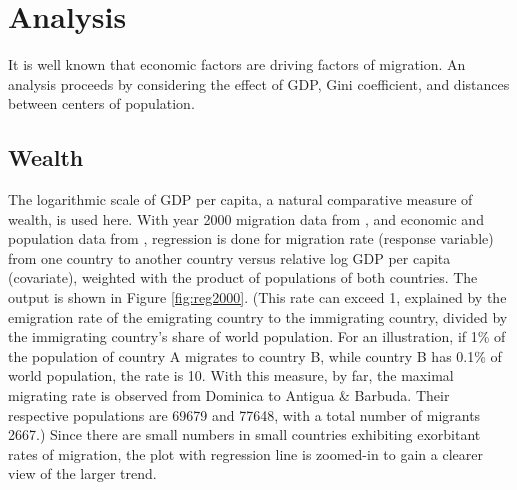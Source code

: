 \documentclass{acm_proc_article-sp}
\begin{document}
\section{Analysis}
It is well known that economic factors are driving factors of migration. An analysis proceeds by considering the effect of GDP, Gini coefficient, and distances between centers of population.

\subsection{Wealth}
The logarithmic scale of GDP per capita, a natural comparative measure of wealth, is used here. With year 2000 migration data from \cite{drc}, and economic and population data from \cite{worldbank_other}, regression \cite{scikit-learn} is done for migration rate (response variable) from one country to another country versus relative log GDP per capita (covariate), weighted with the product of populations of both countries. The output is shown in Figure \ref{fig:reg2000}. (This rate can exceed 1, explained by the emigration rate of the emigrating country to the immigrating country, divided by the immigrating country's share of world population. For an illustration, if 1\% of the population of country A migrates to country B, while country B has 0.1\% of world population, the rate is 10. With this measure, by far, the maximal migrating rate is observed from Dominica to Antigua \& Barbuda. Their respective populations are 69679 and 77648, with a total number of migrants 2667.) Since there are small numbers in small countries exhibiting exorbitant rates of migration, the plot with regression line is zoomed-in to gain a clearer view of the larger trend. 
\end{document}
